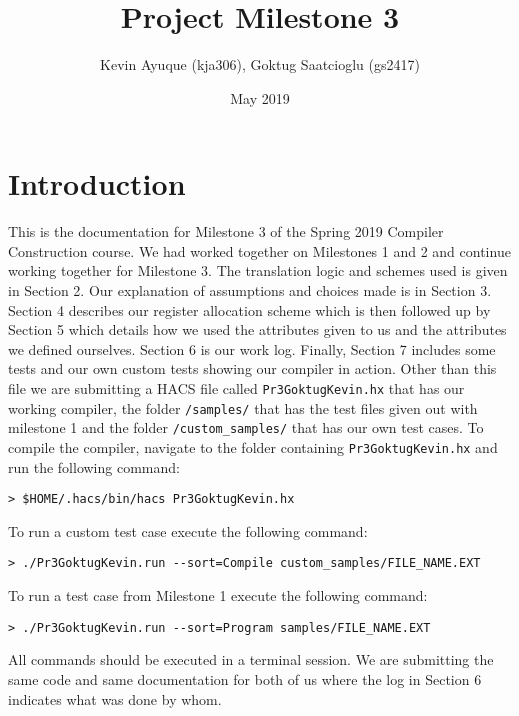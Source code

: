 \documentclass{article}
\title{Project Milestone 3}
\author{Kevin Ayuque (kja306), Goktug Saatcioglu (gs2417)}
\date{May 2019}
\begin{document}
\maketitle

\section{Introduction}
This is the documentation for Milestone 3 of the Spring 2019 Compiler Construction course. We had worked together on Milestones 1 and 2 and continue working together for Milestone 3. The translation logic and schemes used is given in Section 2. Our explanation of assumptions and choices made is in Section 3. Section 4 describes our register allocation scheme which is then followed up by Section 5 which details how we used the attributes given to us and the attributes we defined ourselves. Section 6 is our work log. Finally, Section 7 includes some tests and our own custom tests showing our compiler in action. Other than this file we are submitting a HACS file called \texttt{Pr3GoktugKevin.hx} that has our working compiler, the folder \texttt{/samples/} that has the test files given out with milestone 1 and the folder \texttt{/custom\_samples/} that has our own test cases. To compile the compiler, navigate to the folder containing \texttt{Pr3GoktugKevin.hx} and run the following command:
\begin{verbatim}
> $HOME/.hacs/bin/hacs Pr3GoktugKevin.hx
\end{verbatim}
To run a custom test case execute the following command:
\begin{verbatim}
> ./Pr3GoktugKevin.run --sort=Compile custom_samples/FILE_NAME.EXT
\end{verbatim}
To run a test case from Milestone 1 execute the following command:
\begin{verbatim}
> ./Pr3GoktugKevin.run --sort=Program samples/FILE_NAME.EXT
\end{verbatim}
All commands should be executed in a terminal session. We are submitting the same code and same documentation for both of us where the log in Section 6 indicates what was done by whom.
\end{document}
